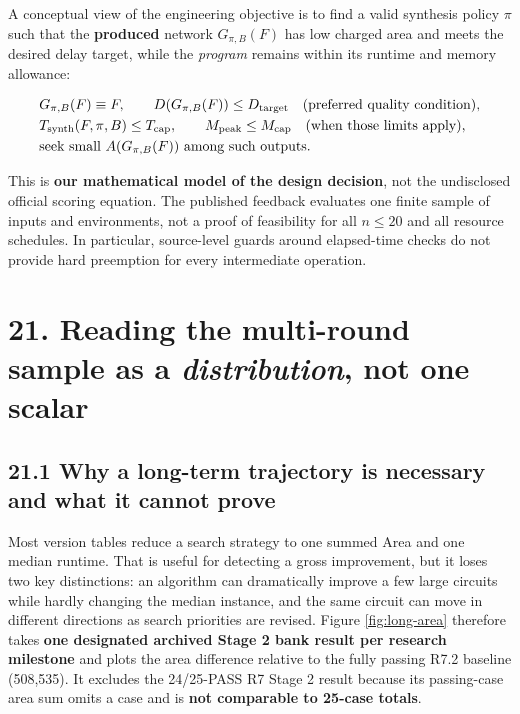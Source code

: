 \documentclass[a4paper,10pt]{article}
\theoremstyle{definition}
\theoremstyle{remark}
\begin{document}
A conceptual view of the engineering objective is to find a valid synthesis policy \(\pi\) such that the \textbf{produced} network \(G_{\pi,B}(F)\) has low charged area and meets the desired delay target, while the \emph{program} remains within its runtime and memory allowance:

\[
\begin{aligned}
& G_{\pi,B}(F)\equiv F,\qquad D(G_{\pi,B}(F))\le D_{\rm target}\quad\text{(preferred quality condition)},\\
& T_{\rm synth}(F,\pi,B)\le T_{\rm cap},\qquad M_{\rm peak}\le M_{\rm cap}
\quad\text{(when those limits apply)},\\
&\text{seek small } A(G_{\pi,B}(F))\text{ among such outputs.}
\end{aligned}
\]

This is \textbf{our mathematical model of the design decision}, not the undisclosed official scoring equation. The published feedback evaluates one finite sample of inputs and environments, not a proof of feasibility for all \(n\le20\) and all resource schedules. In particular, source-level guards around elapsed-time checks do not provide hard preemption for every intermediate operation.

\section{\texorpdfstring{21. Reading the multi-round sample as a \emph{distribution}, not one scalar}{21. Reading the multi-round sample as a distribution, not one scalar}}\label{reading-the-multi-round-sample-as-a-distribution-not-one-scalar}

\subsection{21.1 Why a long-term trajectory is necessary and what it cannot prove}\label{why-a-long-term-trajectory-is-necessary-and-what-it-cannot-prove}

Most version tables reduce a search strategy to one summed Area and one median runtime. That is useful for detecting a gross improvement, but it loses two key distinctions: an algorithm can dramatically improve a few large circuits while hardly changing the median instance, and the same circuit can move in different directions as search priorities are revised. Figure \ref{fig:long-area} therefore takes \textbf{one designated archived Stage 2 bank result per research milestone} and plots the area difference relative to the fully passing R7.2 baseline (508,535). It excludes the 24/25-PASS R7 Stage 2 result because its passing-case area sum omits a case and is \textbf{not comparable to 25-case totals}.
\end{document}
